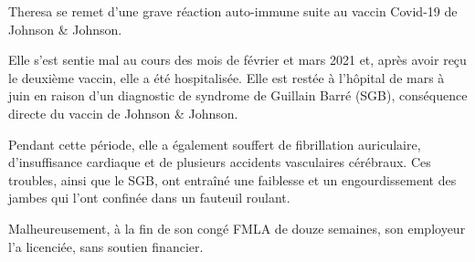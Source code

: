 Theresa se remet d'une grave réaction auto-immune suite au vaccin Covid-19 de
Johnson \& Johnson.

Elle s'est sentie mal au cours des mois de février et mars 2021 et, après avoir
reçu le deuxième vaccin, elle a été hospitalisée. Elle est restée à l'hôpital de
mars à juin en raison d'un diagnostic de syndrome de Guillain Barré (SGB),
conséquence directe du vaccin de Johnson \& Johnson.

Pendant cette période, elle a également souffert de fibrillation auriculaire,
d'insuffisance cardiaque et de plusieurs accidents vasculaires cérébraux. Ces
troubles, ainsi que le SGB, ont entraîné une faiblesse et un engourdissement des
jambes qui l'ont confinée dans un fauteuil roulant.

Malheureusement, à la fin de son congé FMLA de douze semaines, son employeur l'a
licenciée, sans soutien financier.
